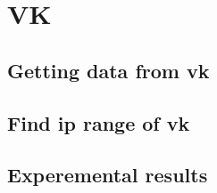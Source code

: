 \section{VK}

\subsection{Getting data from vk}
\subsection{Find ip range of vk}
\subsection{Experemental results}

